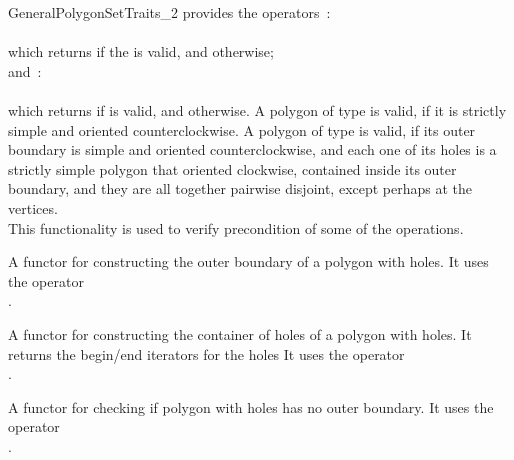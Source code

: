 \begin{ccRefConcept}{GeneralPolygonSetTraits_2}
{provides the operators~: \\
  \\
 which returns  if the  is valid, and 
 otherwise; \\ and~: \\
  \\
 which returns  if  
 is valid, and  otherwise.
 A polygon of type  is valid, if it is strictly simple 
 and oriented counterclockwise.
 A polygon of type  is valid, 
 if its outer boundary is simple and oriented counterclockwise, and each one of 
 its holes is a strictly simple polygon that oriented clockwise, contained inside its outer 
 boundary, and they are all together pairwise disjoint,
 except perhaps at the vertices.\\
 This functionality is used to verify precondition of some of the operations.}


 {A functor for constructing the outer boundary of a polygon with holes.  It uses the operator\\
 .}

 {A functor for constructing the container of holes of a polygon with holes. It returns the begin/end iterators for the holes It uses the operator\\
 .}

 {A functor for checking if polygon with holes has no outer boundary.  It uses the operator\\
.}


\end{ccRefConcept}
